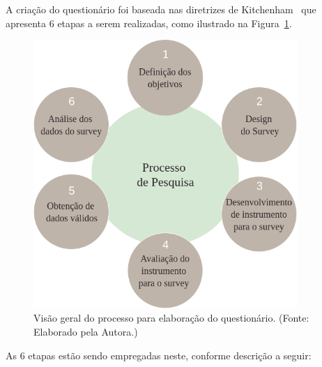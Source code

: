 A criação do questionário foi baseada nas  diretrizes de Kitchenham~\cite{kitchenham2008personal} que apresenta 6 etapas a serem realizadas, como ilustrado na Figura~\ref{fig:Abordagem}.

        \begin{figure}[h]
          \centering
          \includegraphics[width=10cm]{figuras/survey.png}
          \caption{Visão geral do processo para elaboração do questionário.  (Fonte: Elaborado pela Autora.)}
          \label{fig:Abordagem}

        \end{figure}

 As 6 etapas estão sendo empregadas neste, conforme descrição a seguir:


